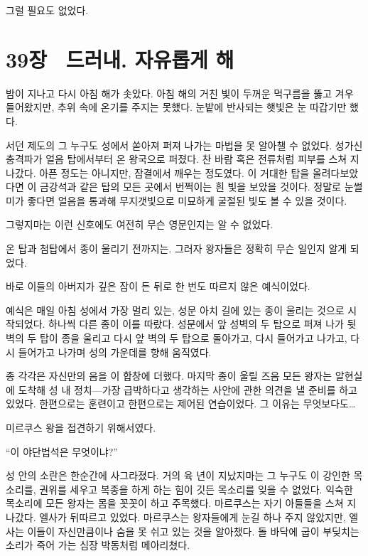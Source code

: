 그럴 필요도 없었다.



\chapter[39장  드러내. 자유롭게 해][39장\hspace*{.5em}드러내. 자유롭게 해]{39장 \ 드러내. 자유롭게 해}



밤이 지나고 다시 아침 해가 솟았다. 아침 해의 거친 빛이 두꺼운 먹구름을 뚫고 겨우 들어왔지만, 추위 속에 온기를 주지는 못했다. 눈밭에 반사되는 햇빛은 눈 따갑기만 했다.

서던 제도의 그 누구도 성에서 쏟아져 퍼져 나가는 마법을 못 알아챌 수 없었다. 성가신 충격파가 얼음 탑에서부터 온 왕국으로 퍼졌다. 찬 바람 혹은 전류처럼 피부를 스쳐 지나갔다. 아픈 정도는 아니지만, 잠결에서 깨우는 정도였다. 이 거대한 탑을 올려다보았다면 이 금강석과 같은 탑의 모든 곳에서 번쩍이는 흰 빛을 보았을 것이다. 정말로 눈썰미가 좋다면 얼음을 통과해 무지갯빛으로 미묘하게 굴절된 빛도 볼 수 있을 것이다.

그렇지마는 이런 신호에도 여전히 무슨 영문인지는 알 수 없었다.

온 탑과 첨탑에서 종이 울리기 전까지는. 그러자 왕자들은 정확히 무슨 일인지 알게 되었다.

바로 이들의 아버지가 깊은 잠이 든 뒤로 한 번도 따르지 않은 예식이었다.

예식은 매일 아침 성에서 가장 멀리 있는, 성문 아치 길에 있는 종이 울리는 것으로 시작되었다. 하나씩 다른 종이 이를 따랐다. 성문에서 앞 성벽의 두 탑으로 퍼져 나가 뒷벽의 두 탑이 종을 울리고 다시 앞 벽의 두 탑으로 돌아가고, 다시 들어가고 나가고, 다시 들어가고 나가며 성의 가운데를 향해 움직였다.

종 각각은 자신만의 음을 이 합창에 더했다. 마지막 종이 울릴 즈음 모든 왕자는 알현실에 도착해 성 내 정치—가장 급박하다고 생각하는 사안에 관한 의견을 낼 준비를 하고 있었다. 한편으로는 훈련이고 한편으로는 제어된 연습이었다. 그 이유는 무엇보다도\ldots

미르쿠스 왕을 접견하기 위해서였다.

``이 야단법석은 무엇이냐?''

성 안의 소란은 한순간에 사그라졌다. 거의 육 년이 지났지마는 그 누구도 이 강인한 목소리를, 권위를 세우고 복종을 하게 하는 힘이 깃든 목소리를 잊을 수 없었다. 익숙한 목소리에 모든 왕자는 몸을 꼿꼿이 하고 주목했다. 마르쿠스는 자기 아들들을 스쳐 지나갔다. 엘사가 뒤따르고 있었다. 마르쿠스는 왕자들에게 눈길 하나 주지 않았지만, 엘사는 이들이 자신만큼이나 숨을 못 쉬고 있는 것을 알아챘다. 돌 바닥에 굽이 부딪치는 소리가 죽어 가는 심장 박동처럼 메아리쳤다.

